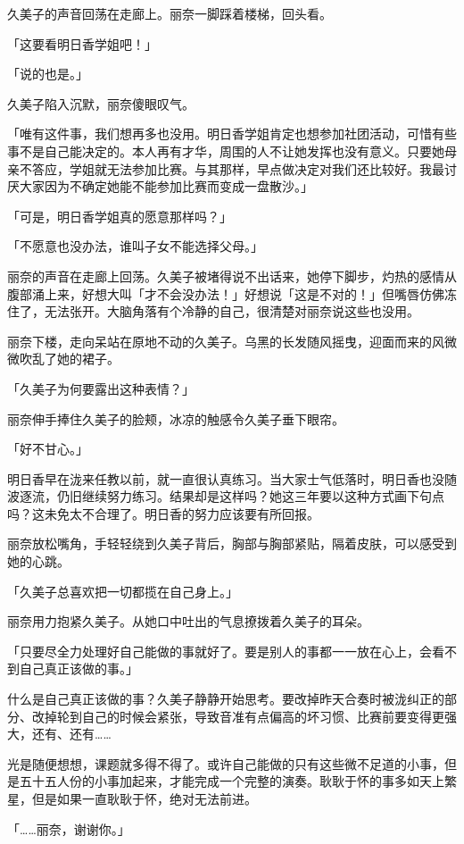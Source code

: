\documentclass[UTF8]{ctexart}
\begin{document}
    久美子的声音回荡在走廊上。丽奈一脚踩着楼梯，回头看。 

    「这要看明日香学姐吧！」 

    「说的也是。」 

    久美子陷入沉默，丽奈傻眼叹气。 

    「唯有这件事，我们想再多也没用。明日香学姐肯定也想参加社团活动，可惜有些事不是自己能决定的。本人再有才华，周围的人不让她发挥也没有意义。只要她母亲不答应，学姐就无法参加比赛。与其那样，早点做决定对我们还比较好。我最讨厌大家因为不确定她能不能参加比赛而变成一盘散沙。」 

    「可是，明日香学姐真的愿意那样吗？」 

    「不愿意也没办法，谁叫子女不能选择父母。」 

    丽奈的声音在走廊上回荡。久美子被堵得说不出话来，她停下脚步，灼热的感情从腹部涌上来，好想大叫「才不会没办法！」好想说「这是不对的！」但嘴唇仿佛冻住了，无法张开。大脑角落有个冷静的自己，很清楚对丽奈说这些也没用。 

    丽奈下楼，走向呆站在原地不动的久美子。乌黑的长发随风摇曳，迎面而来的风微微吹乱了她的裙子。 

    「久美子为何要露出这种表情？」 

    丽奈伸手捧住久美子的脸颊，冰凉的触感令久美子垂下眼帘。 

    「好不甘心。」 

    明日香早在泷来任教以前，就一直很认真练习。当大家士气低落时，明日香也没随波逐流，仍旧继续努力练习。结果却是这样吗？她这三年要以这种方式画下句点吗？这未免太不合理了。明日香的努力应该要有所回报。 

    丽奈放松嘴角，手轻轻绕到久美子背后，胸部与胸部紧贴，隔着皮肤，可以感受到她的心跳。 

    「久美子总喜欢把一切都揽在自己身上。」 

    丽奈用力抱紧久美子。从她口中吐出的气息撩拨着久美子的耳朵。 

    「只要尽全力处理好自己能做的事就好了。要是别人的事都一一放在心上，会看不到自己真正该做的事。」 

    什么是自己真正该做的事？久美子静静开始思考。要改掉昨天合奏时被泷纠正的部分、改掉轮到自己的时候会紧张，导致音准有点偏高的坏习惯、比赛前要变得更强大，还有、还有…… 

    光是随便想想，课题就多得不得了。或许自己能做的只有这些微不足道的小事，但是五十五人份的小事加起来，才能完成一个完整的演奏。耿耿于怀的事多如天上繁星，但是如果一直耿耿于怀，绝对无法前进。 

    「……丽奈，谢谢你。」 
\end{document}

